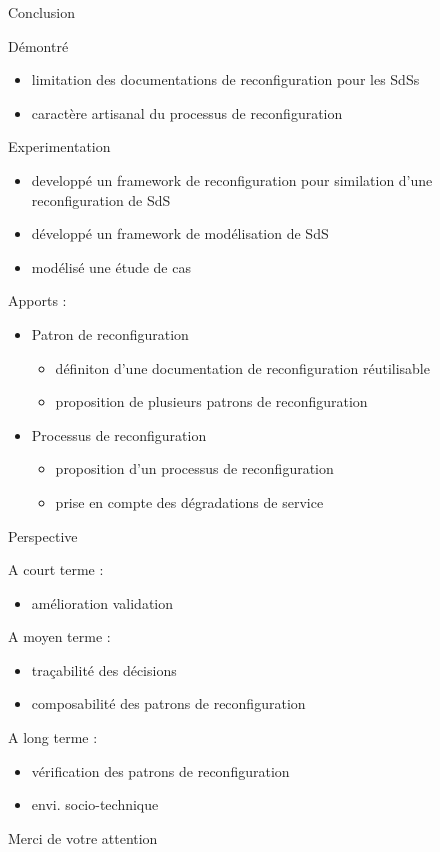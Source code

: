 \begin{frame}{Conclusion}

Démontré
\begin{itemize}
\item limitation des documentations de reconfiguration pour les SdSs
\item caractère artisanal du processus de reconfiguration
\end{itemize}

Experimentation 
\begin{itemize}
\item developpé un framework de reconfiguration pour similation d'une
reconfiguration de SdS
\item développé un framework de modélisation de SdS
\item modélisé une étude de cas 
\end{itemize} 

Apports :
\begin{itemize}
\item Patron de reconfiguration 
\begin{itemize}
\item définiton d'une documentation de reconfiguration réutilisable
\item proposition de plusieurs patrons de reconfiguration
\end{itemize}
\item Processus de reconfiguration 
\begin{itemize}
\item proposition d'un processus de reconfiguration
\item prise en compte des dégradations de service
\end{itemize}
\end{itemize}
\end{frame}

\begin{frame}{Perspective}
\begin{block}{A court terme :} 
\begin{itemize}
\item amélioration validation
\end{itemize}
\end{block}

\begin{block}{A moyen terme : }
\begin{itemize}
\item traçabilité des décisions
\item composabilité des patrons de reconfiguration
\end{itemize}
\end{block}

\begin{block}{A long terme : }
\begin{itemize}
\item vérification des patrons de reconfiguration
\item envi. socio-technique
\end{itemize}
\end{block}
\end{frame}


\begin{frame}[plain]
    Merci de votre attention
\end{frame}
